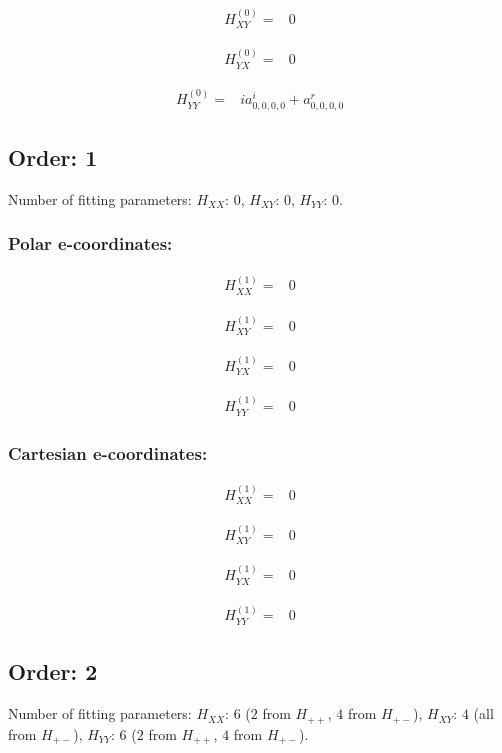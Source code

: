 \documentclass[fleqn]{article}
\begin{document}
\begin{align*}
H_{XY}^{(0)}=&0
\end{align*}

\begin{align*}
H_{YX}^{(0)}=&0
\end{align*}

\begin{align*}
H_{YY}^{(0)}=& i a^{i}_{0,0,0,0} +  a^{r}_{0,0,0,0}
\end{align*}
\subsection{Order: 1}
Number of fitting parameters: $H_{XX}$: $0$, $H_{XY}$: $0$, $H_{YY}$: $0$.
\subsubsection*{Polar e-coordinates:}

\begin{align*}
H_{XX}^{(1)}=&0
\end{align*}

\begin{align*}
H_{XY}^{(1)}=&0
\end{align*}

\begin{align*}
H_{YX}^{(1)}=&0
\end{align*}

\begin{align*}
H_{YY}^{(1)}=&0
\end{align*}
\subsubsection*{Cartesian e-coordinates:}

\begin{align*}
H_{XX}^{(1)}=&0
\end{align*}

\begin{align*}
H_{XY}^{(1)}=&0
\end{align*}

\begin{align*}
H_{YX}^{(1)}=&0
\end{align*}

\begin{align*}
H_{YY}^{(1)}=&0
\end{align*}
\subsection{Order: 2}
Number of fitting parameters: $H_{XX}$: $6$ ($2$ from $H_{++}$, $4$ from $H_{+-}$), $H_{XY}$: $4$ (all from $H_{+-}$), $H_{YY}$: $6$ ($2$ from $H_{++}$, $4$ from $H_{+-}$).
\end{document}
